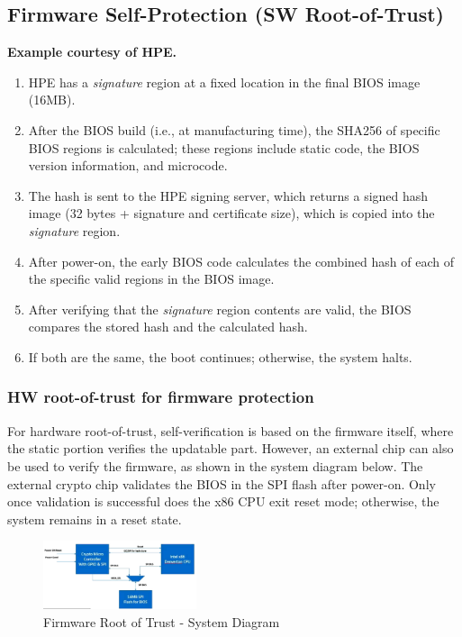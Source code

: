 \subsection{Firmware Self-Protection (SW Root-of-Trust)}

\textbf{Example courtesy of HPE.}
\begin{enumerate}[itemsep=0pt]
    \item HPE has a \textit{signature} region at a fixed location in the final BIOS image (16MB).
    \item After the BIOS build (i.e., at manufacturing time), the SHA256 of specific BIOS regions is calculated; these regions include static code, the BIOS version information, and microcode.
    \item The hash is sent to the HPE signing server, which returns a signed hash image (32 bytes + signature and certificate size), which is copied into the \textit{signature} region.
    \item After power-on, the early BIOS code calculates the combined hash of each of the specific valid regions in the BIOS image.
    \item After verifying that the \textit{signature} region contents are valid, the BIOS compares the stored hash and the calculated hash.
    \item If both are the same, the boot continues; otherwise, the system halts.
\end{enumerate}


\subsubsection{HW root-of-trust for firmware protection}
For hardware root-of-trust, self-verification is based on the firmware itself, where the static portion verifies the updatable part. However, an external chip can also be used to verify the firmware, as shown in the system diagram below. The external crypto chip validates the BIOS in the SPI flash after power-on. Only once validation is successful does the x86 CPU exit reset mode; otherwise, the system remains in a reset state.

\begin{figure}
    \centering
    \includegraphics[width=0.4\textwidth]{img/hw-rot-for-firmware.png}
    \caption{Firmware Root of Trust - System Diagram}
\end{figure}

